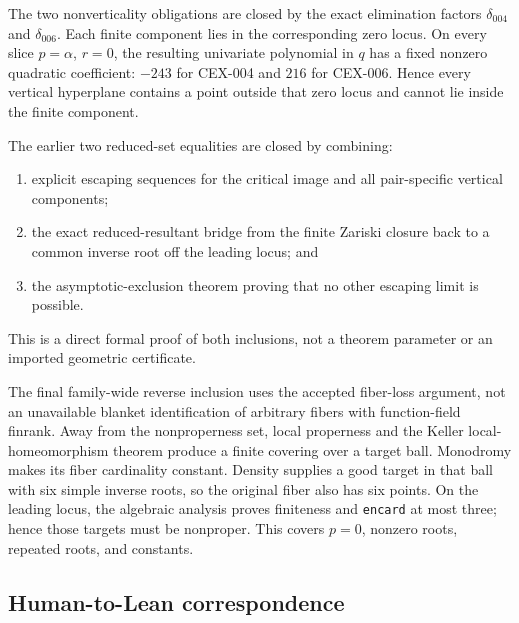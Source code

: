 \documentclass[11pt]{article}
\begin{document}
The two nonverticality obligations are closed by the exact elimination factors
$\delta_{004}$ and $\delta_{006}$.  Each finite component lies in the
corresponding zero locus.  On every slice $p=\alpha$, $r=0$, the resulting
univariate polynomial in $q$ has a fixed nonzero quadratic coefficient:
$-243$ for CEX-004 and $216$ for CEX-006.  Hence every vertical hyperplane
contains a point outside that zero locus and cannot lie inside the finite
component.

The earlier two reduced-set equalities are closed by combining:
\begin{enumerate}
 \item explicit escaping sequences for the critical image and all pair-specific
       vertical components;
 \item the exact reduced-resultant bridge from the finite Zariski closure back
       to a common inverse root off the leading locus; and
 \item the asymptotic-exclusion theorem proving that no other escaping limit is
       possible.
\end{enumerate}
This is a direct formal proof of both inclusions, not a theorem parameter or an
imported geometric certificate.

The final family-wide reverse inclusion uses the accepted fiber-loss argument,
not an unavailable blanket identification of arbitrary fibers with
function-field finrank.  Away from the nonproperness set, local properness and
the Keller local-homeomorphism theorem produce a finite covering over a target
ball.  Monodromy makes its fiber cardinality constant.  Density supplies a
good target in that ball with six simple inverse roots, so the original fiber
also has six points.  On the leading locus, the algebraic analysis proves
finiteness and \texttt{encard} at most three; hence those targets must be
nonproper.  This covers $p=0$, nonzero roots, repeated roots, and constants.

\subsection{Human-to-Lean correspondence}
\end{document}
